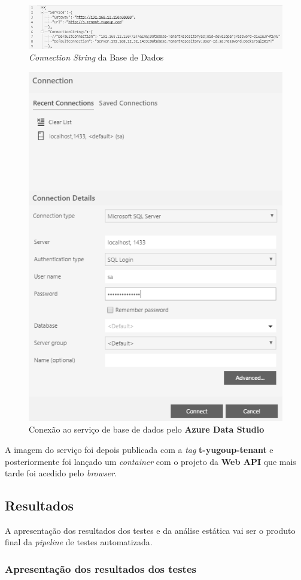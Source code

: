 \begin{figure}[hbt!]
\centering
\includegraphics[width=0.9\linewidth]{Cap6/TenantConnectionString.png}
\caption{\textit{Connection String} da Base de Dados}
\label{Fig:Fig80}
\end{figure}

\begin{figure}[hbt!]
\centering
\includegraphics[width=0.4\linewidth]{Cap6/MSSQLServerTenantRepository.png}
\caption{Conexão ao serviço de base de dados pelo \textbf{Azure Data Studio}}
\label{Fig:Fig81}
\end{figure}

\hspace{1cm}A imagem do serviço foi depois publicada com a \textit{tag} \textbf{t-yugoup-tenant} e posteriormente foi lançado um \textit{container} com o projeto da \textbf{Web API} que mais tarde foi acedido pelo \textit{browser}.

\subsection{Resultados}

\hspace{1cm}A apresentação dos resultados dos testes e da análise estática vai ser o produto final da \textit{pipeline} de testes automatizada. 

\subsubsection{Apresentação dos resultados dos testes}

